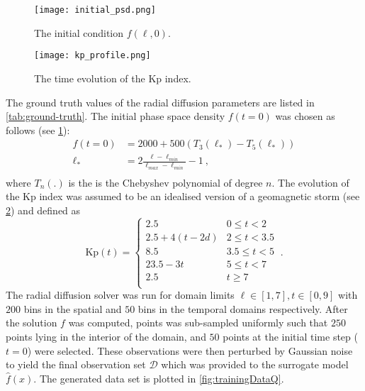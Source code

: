 \begin{figure*}[!htb]
  \centering
  \begin{subfigure}[b]{0.75\textwidth}
    \centering
    \texttt{[image: initial\_psd.png]}
    \caption{ 
      {\small The initial condition $f(\ell, 0)$.}
    }
    \label{fig:initialpsd}
  \end{subfigure}
  \hfill
  \begin{subfigure}[b]{0.75\textwidth}
    \centering
    \texttt{[image: kp\_profile.png]}
    \caption{
      {\small The time evolution of the Kp index.}
    }
    \label{fig:kpProfile}
  \end{subfigure}
  \caption{Synthetic data generation.}
\end{figure*}

 
The ground truth values of the radial diffusion parameters are listed in \cref{tab:ground-truth}.
%
The initial phase space density $f(t = 0)$ was chosen as follows (see \cref{fig:initialpsd}):
%
\begin{align*}
f(t = 0) &= 2000 + 500(T_{3}(\ell_*) - T_{5}(\ell_*)) \\
\ell_* &= 2\frac{\ell - \ell_{min}}{\ell_{max} - \ell_{min}} - 1 \ ,\\
\end{align*}
%
where $T_n(.)$ is the is the Chebyshev polynomial of degree $n$. The evolution of the Kp index was 
assumed to be an idealised version of a geomagnetic storm (see \cref{fig:kpProfile}) and 
defined as 
\[
  \mathrm{Kp}(t) = \left\{\begin{matrix}
    2.5 & 0 \leq t < 2\\ 
    2.5 + 4(t - 2d) & 2 \leq t < 3.5\\ 
    8.5 & 3.5 \leq  t < 5 \\ 
    23.5 - 3t & 5 \leq t < 7\\
    2.5 & t \geq 7\\ 
    \end{matrix}\right. \ .
\] 
%
The radial diffusion solver was run for domain limits $\ell \in [1, 7], t \in [0, 9]$ with $200$ 
bins in the spatial and $50$ bins in the temporal domains respectively. After the solution $f$ was 
computed, points was sub-sampled uniformly such that $250$ points lying in the interior of the 
domain, and $50$ points at the initial time step ($t = 0$) were selected. These observations were 
then perturbed by Gaussian noise to yield the final observation set $\mathcal{D}$ which was 
provided to the surrogate model $\hat{f}(x)$. The generated data set is plotted in 
\cref{fig:trainingDataQ}.


